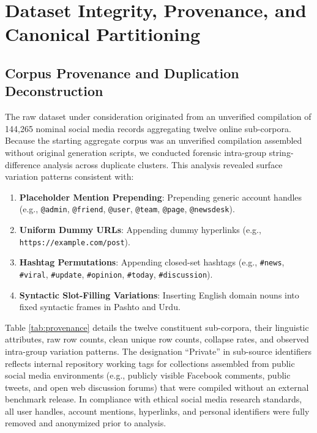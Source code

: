 \documentclass[11pt,a4paper]{article}
\begin{document}
\section{Dataset Integrity, Provenance, and Canonical Partitioning}\label{sec:dataset}

\subsection{Corpus Provenance and Duplication Deconstruction}
The raw dataset under consideration originated from an unverified compilation of 144,265 nominal social media records aggregating twelve online sub-corpora. Because the starting aggregate corpus was an unverified compilation assembled without original generation scripts, we conducted forensic intra-group string-difference analysis across duplicate clusters. This analysis revealed surface variation patterns consistent with:
\begin{enumerate}
    \item \textbf{Placeholder Mention Prepending}: Prepending generic account handles (e.g., \texttt{@admin}, \texttt{@friend}, \texttt{@user}, \texttt{@team}, \texttt{@page}, \texttt{@newsdesk}).
    \item \textbf{Uniform Dummy URLs}: Appending dummy hyperlinks (e.g., \texttt{https://example.com/post}).
    \item \textbf{Hashtag Permutations}: Appending closed-set hashtags (e.g., \texttt{\#news}, \texttt{\#viral}, \texttt{\#update}, \texttt{\#opinion}, \texttt{\#today}, \texttt{\#discussion}).
    \item \textbf{Syntactic Slot-Filling Variations}: Inserting English domain nouns into fixed syntactic frames in Pashto and Urdu.
\end{enumerate}

Table \ref{tab:provenance} details the twelve constituent sub-corpora, their linguistic attributes, raw row counts, clean unique row counts, collapse rates, and observed intra-group variation patterns. The designation ``Private'' in sub-source identifiers reflects internal repository working tags for collections assembled from public social media environments (e.g., publicly visible Facebook comments, public tweets, and open web discussion forums) that were compiled without an external benchmark release. In compliance with ethical social media research standards, all user handles, account mentions, hyperlinks, and personal identifiers were fully removed and anonymized prior to analysis.
\end{document}
